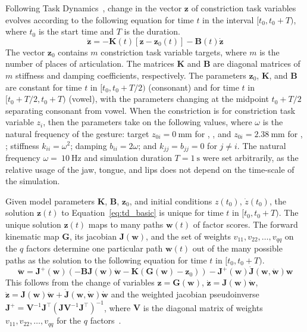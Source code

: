 \documentclass[reprint]{JASAnew}\usepackage[]{graphicx}\usepackage[]{color}
\begin{document}
Following Task Dynamics~\citep{saltzman1989dynamical}, change in the vector $\mathbf{z}$ of constriction task variables evolves according to the following equation for time $t$ in the interval $[t_0, t_0+T)$, where $t_0$ is the start time and $T$ is the duration.
\begin{equation}
\label{eq:td_basic}
\mathbf{\ddot{z}} = -\mathbf{K}(t)\left[\mathbf{z} - \mathbf{z}_0(t)\right] -\mathbf{B}(t)\mathbf{\dot{z}}
\end{equation}
The vector $\mathbf{z}_0$ contains $m$ constriction task variable targets, where $m$ is the number of places of articulation. The matrices $\mathbf{K}$ and $\mathbf{B}$ are diagonal matrices of $m$ stiffness and damping coefficients, respectively.
The parameters $\mathbf{z}_0$, $\mathbf{K}$, and $\mathbf{B}$ are constant for time $t$ in $[t_0, t_0+T/2)$ (consonant) and for time $t$ in $[t_0+T/2, t_0+T)$ (vowel), with the parameters changing at the midpoint $t_0+T/2$ separating consonant from vowel.
When the constriction is for constriction task variable $z_i$, then the parameters take on the following values, where $\omega$ is the natural frequency of the gesture: target $z_{0i} = \SI{0}{\milli\meter}$ for \textipa{[p]}, \textipa{[t]}, \textipa{[k]} and $z_{0i} = \SI{2.38}{\milli\meter}$ for \textipa{[i]}, \textipa{[a]}; stiffness $k_{ii} = \omega^2$; damping $b_{ii} = 2\omega$; and $k_{jj} = b_{jj} = 0$ for $j \neq i$.
The natural frequency $\omega = ~\SI{10}{\Hz}$ and simulation duration $T= \SI{1}{\second}$ were set arbitrarily, as the relative usage of the jaw, tongue, and lips does not depend on the time-scale of the simulation.

Given model parameters $\mathbf{K}$, $\mathbf{B}$, $\mathbf{z}_0$, and initial conditions $z(t_0)$, $\dot{z}(t_0)$, the solution $\mathbf{z}(t)$ to Equation~\ref{eq:td_basic} is unique for time $t$ in $[t_0,t_0+T)$. The unique solution $\mathbf{z}(t)$ maps to many paths $\mathbf{w}(t)$ of factor scores. The forward kinematic map $\mathbf{G}$, its jacobian $\mathbf{J}(\mathbf{w})$, and the set of weights $v_{11}, v_{22}, \ldots, v_{qq}$ on the $q$ factors determine one particular path $\mathbf{w}(t)$ out of the many possible paths as the solution to the following equation for time $t$ in $[t_0, t_0+T)$.
\begin{equation}
\label{eq:td_weight_path}
\mathbf{\ddot{w}} = \mathbf{J}^+(\mathbf{w}) (-\mathbf{B}\mathbf{J}(\mathbf{w})\mathbf{\dot{w}} - \mathbf{K}(\mathbf{G}(\mathbf{w})-\mathbf{z}_0)) - \mathbf{J}^+(\mathbf{w})\mathbf{\dot{J}}(\mathbf{w},\mathbf{\dot{w}})\mathbf{w}
\end{equation}
This follows from the change of variables $\mathbf{z} = \mathbf{G}(\mathbf{w})$, $\mathbf{\dot{z}} = \mathbf{J}(\mathbf{w})\mathbf{\dot{w}}$, $\mathbf{\ddot{z}} = \mathbf{J}(\mathbf{w})\mathbf{\ddot{w}} + \mathbf{\dot{J}}(\mathbf{w},\mathbf{\dot{w}})\mathbf{\dot{w}}$ and the weighted jacobian pseudoinverse $\mathbf{J}^+ = \mathbf{V}^{-1}\mathbf{J}^\intercal (\mathbf{J}\mathbf{V}^{-1}\mathbf{J}^\intercal)^{-1}$, where $\mathbf{V}$ is the diagonal matrix of weights $v_{11}, v_{22}, \ldots, v_{qq}$ for the $q$ factors~\citep{saltzman1989dynamical}. 
\end{document}
